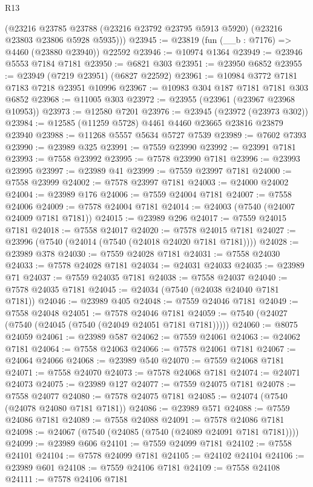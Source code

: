 \begin{lexlean}{R13}
\begin{coremodule}
      (@23216 @23785 @23788 (@23216 @23792 @23795 @5913 @5920) (@23216 @23803 @23806 @5928 @5935)))
@23945 := @23819 (fun (__b : @7176) => @4460 (@23880 @23940)) @22592
@23946 := @10974 @1364
@23949 := @23946 @5553 @7184 @7181
@23950 := @6821 @303
@23951 := @23950 @6852
@23955 := @23949 (@7219 @23951) (@6827 @22592)
@23961 := @10984 @3772 @7181 @7183 @7218 @23951 @10996
@23967 := @10983 @304 @187 @7181 @7181 @303 @6852
@23968 := @11005 @303
@23972 := @23955 (@23961 (@23967 @23968 @10953))
@23973 := @12580 @7201
@23976 := @23945 (@23972 (@23973 @302))
@23984 := @12585 (@11259 @5728) @4461 @4460 @23665 @23816 @23879 @23940
@23988 := @11268 @5557 @5634 @5727 @7539
@23989 := @7602 @7393
@23990 := @23989 @325
@23991 := @7559 @23990
@23992 := @23991 @7181
@23993 := @7558 @23992
@23995 := @7578 @23990 @7181
@23996 := @23993 @23995
@23997 := @23989 @41
@23999 := @7559 @23997 @7181
@24000 := @7558 @23999
@24002 := @7578 @23997 @7181
@24003 := @24000 @24002
@24004 := @23989 @176
@24006 := @7559 @24004 @7181
@24007 := @7558 @24006
@24009 := @7578 @24004 @7181
@24014 := @24003 (@7540 (@24007 @24009 @7181 @7181))
@24015 := @23989 @296
@24017 := @7559 @24015 @7181
@24018 := @7558 @24017
@24020 := @7578 @24015 @7181
@24027 := @23996 (@7540 (@24014 (@7540 (@24018 @24020 @7181 @7181))))
@24028 := @23989 @378
@24030 := @7559 @24028 @7181
@24031 := @7558 @24030
@24033 := @7578 @24028 @7181
@24034 := @24031 @24033
@24035 := @23989 @71
@24037 := @7559 @24035 @7181
@24038 := @7558 @24037
@24040 := @7578 @24035 @7181
@24045 := @24034 (@7540 (@24038 @24040 @7181 @7181))
@24046 := @23989 @405
@24048 := @7559 @24046 @7181
@24049 := @7558 @24048
@24051 := @7578 @24046 @7181
@24059 := @7540 (@24027 (@7540 (@24045 (@7540 (@24049 @24051 @7181 @7181)))))
@24060 := @8075 @24059
@24061 := @23989 @587
@24062 := @7559 @24061
@24063 := @24062 @7181
@24064 := @7558 @24063
@24066 := @7578 @24061 @7181
@24067 := @24064 @24066
@24068 := @23989 @540
@24070 := @7559 @24068 @7181
@24071 := @7558 @24070
@24073 := @7578 @24068 @7181
@24074 := @24071 @24073
@24075 := @23989 @127
@24077 := @7559 @24075 @7181
@24078 := @7558 @24077
@24080 := @7578 @24075 @7181
@24085 := @24074 (@7540 (@24078 @24080 @7181 @7181))
@24086 := @23989 @571
@24088 := @7559 @24086 @7181
@24089 := @7558 @24088
@24091 := @7578 @24086 @7181
@24098 := @24067 (@7540 (@24085 (@7540 (@24089 @24091 @7181 @7181))))
@24099 := @23989 @606
@24101 := @7559 @24099 @7181
@24102 := @7558 @24101
@24104 := @7578 @24099 @7181
@24105 := @24102 @24104
@24106 := @23989 @601
@24108 := @7559 @24106 @7181
@24109 := @7558 @24108
@24111 := @7578 @24106 @7181

\end{coremodule}
\end{lexlean}
